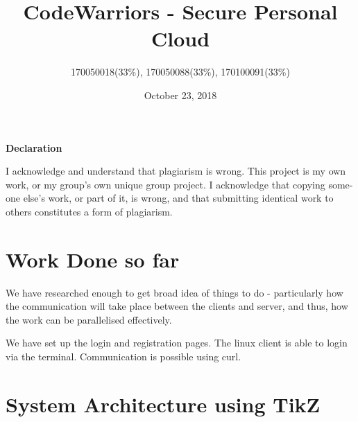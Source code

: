 \documentclass[a4paper]{article}
\title{CodeWarriors - Secure Personal Cloud}
\author{170050018(33\%), 170050088(33\%), 170100091(33\%)}
\date{October 23, 2018}
\begin{document}
\setlength\parindent{1cm}

\maketitle
\hfill\begin{minipage}{\dimexpr\textwidth-1cm}
\centerline{ \textbf{Declaration}}
 I acknowledge and understand that plagiarism is wrong. This project is my own
work, or my group’s own unique group project. I acknowledge that copying some-
one else’s work, or part of it, is wrong, and that submitting identical work to others constitutes a form of plagiarism.
\end{minipage}

\section{Work Done so far}

We have researched enough to get broad idea of things to do - particularly how the communication will take place between the clients and server, and thus, how the work can be parallelised effectively.

\noindent We have set up the login and registration pages\cite{login}. The linux client is able to login via the terminal\cite{linux-client-login}. Communication is possible using curl.

\section{System Architecture using TikZ}
\end{document}
